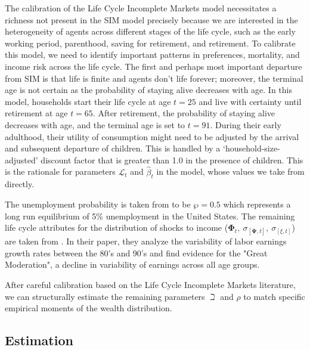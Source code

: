 \documentclass{article}
\newcommand{\DiscFac}{\beta}
\newcommand{\Alive}{\mathcal{L}}
\newcommand{\CRRA}{\rho}
\newcommand{\PermGroFac}{\pmb{\Phi}}
\newcommand{\PermShk}{\mathbf{\Psi}}
\newcommand{\pZero}{\wp}
\begin{document}
The calibration of the Life Cycle Incomplete Markets model necessitates a richness not present in the SIM model precisely because we are interested in the heterogeneity of agents across different stages of the life cycle, such as the early working period, parenthood, saving for retirement, and retirement. To calibrate this model, we need to identify important patterns in preferences, mortality, and income risk across the life cycle. The first and perhaps most important departure from SIM is that life is finite and agents don't life forever; moreover, the terminal age is not certain as the probability of staying alive decreases with age. In this model, households start their life cycle at age $t = 25$ and live with certainty until retirement at age $t = 65$. After retirement, the probability of staying alive decreases with age, and the terminal age is set to $t = 91$. During their early adulthood, their utility of consumption might need to be adjusted by the arrival and subsequent departure of children. This is handled by a `household-size-adjusted' discount factor that is greater than 1.0 in the presence of children. This is the rationale for parameters $\Alive_{t}$ and $\hat{\DiscFac}_{t}$ in the model, whose values we take from \cite{Cagetti_2003} directly.

The unemployment probability is taken from \cite{Carroll_1992} to be $\pZero = 0.5$ which represents a long run equilibrium of 5\% unemployment in the United States. The remaining life cycle attributes for the distribution of shocks to income ($\PermGroFac_{t}, \ \sigma_{[\PermShk, t]}, \ \sigma_{[\xi, t]}$) are taken from \cite{Sabelhaus_2010}. In their paper, they analyze the variability of labor earnings growth rates between the 80's and 90's and find evidence for the "Great Moderation", a decline in variability of earnings across all age groups.

After careful calibration based on the Life Cycle Incomplete Markets literature, we can structurally estimate the remaining parameters $\beth$ and $\CRRA$ to match specific empirical moments of the wealth distribution.

\subsection{Estimation}\label{Estimation}
\end{document}
